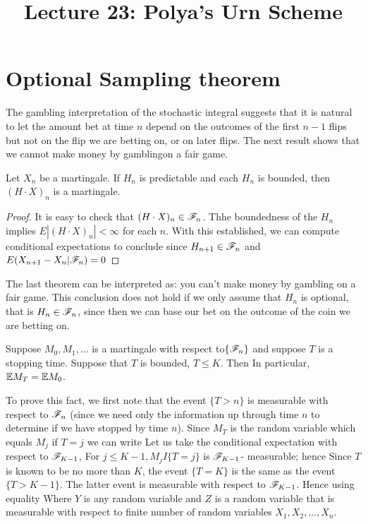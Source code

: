 \documentclass[a4paper,english,10pt]{article}
\title{Lecture 23: Polya's Urn Scheme}
\author{}
\begin{document}
\maketitle
\section{Optional Sampling theorem}
The gambling interpretation of the stochastic integral suggests that it is natural to let the amount bet at time $n$ depend on the outcomes of the first $n-1$ flips but not on the flip we are betting on, or on later flips. The next result shows that we cannot make money by gamblingon a fair game.

\begin{thm}Let $X_n$ be a martingale. If $H_n$ is predictable and each $H_n$ is bounded, then $(H\cdot X)_n$ is a martingale.
\end{thm}
\begin{proof} It is easy to check that $(H\cdot X)_n \in \mathscr{F}_n$. Thhe boundedness of the $H_n$ implies $E|(H\cdot X)_n|<\infty$ for each $n$. With this established, we can compute conditional expectations to conclude
since $H_{n+1}\in \mathscr{F}_n$ and $E(X_{n+1}-X_n| \mathscr{F}_n)=0$
\end{proof}
The last theorem can be interpreted as: you can't make money by gambling on a fair game. This conclusion does not hold if we only assume that $H_n$ is optional, that is $H_n\in \mathscr{F}_n$, since then we can base our bet on the outcome of the coin we are betting on.

\begin{thm} 
Suppose $M_0,M_1,\dots $ is a martingale with respect to$\{\mathscr{F}_n\}$ and suppose $T$ is a stopping time. Suppose that $T$ is bounded, $T\leq K$. Then
In particular, $\mathbb{E} M_T=\mathbb{E} M_0$.
\end{thm}
To prove this fact, we first note that the event $\{T>n\}$ is measurable with respect to $\mathscr{F}_n$ (since we need only the information up through time $n$ to determine if we have stopped by time $n$). 
Since $M_T$ is the random variable which equals $M_j$ if $T=j$ we can write
Let us take the conditional expectation with respect to $\mathscr{F}_{K-1}$,
For $j\leq K-1, M_jI\{T=j\}$ is $\mathscr{F}_{K-1}$- measurable; hence
Since $T$ is known to be no more than $K$, the event $\{T=K\}$ is the same as the event $\{T>K-1\}$. The latter event is measurable with respect to $\mathscr{F}_{K-1}$. Hence using equality
Where $Y$ is any random variable and $Z$ is a random variable that is measurable with respect to finite number of random variables $X_1,X_2,\dots,X_n$.
\end{document}
